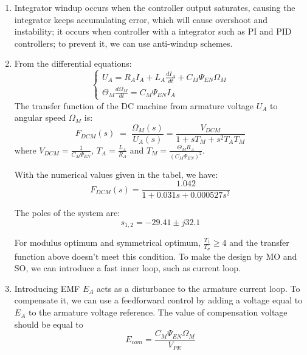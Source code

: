 \documentclass[12pt,a4paper, openany]{book}
\begin{document}
\begin{enumerate}
\item {\bf *}  Integrator windup occurs when the controller output saturates, causing the integrator keeps accumulating error, which will cause overshoot and instability; it occurs when controller with a integrator such as PI and PID controllers; to prevent it, we can use anti-windup schemes.
\item {\bf *} 
From the differential equations:
\begin{equation}
    \begin{cases}
    U_A = R_A I_A + L_A \frac{dI_A}{dt} + C_M \Psi_{EN} \Omega_M \\
    \Theta_M \frac{d \Omega_M}{dt}=C_M \Psi_{EN} I_A
    \end{cases}
\end{equation}
The transfer function of the DC machine from armature voltage $U_A$ to angular speed $\Omega_M$ is:
\begin{equation}
    F_{DCM}(s) \;=\; \frac{\Omega_M(s)}{U_A(s)} 
= \frac{V_{DCM}}{1 + sT_M + s^2 T_A T_M}
\end{equation}
where $V_{DCM} = \frac{1}{C_M \Psi_{EN}}$, $T_A = \frac{L_A}{R_A}$ and $T_M = \frac{\Theta_M R_A}{(C_M \Psi_{EN})^2}$.

With the numerical values given in the tabel, we have:
\begin{equation}
    F_{DCM}(s) = \frac{1.042}{1 + 0.031 s + 0.000527 s^2}        
\end{equation}

The poles of the system are:
\begin{equation}    
    s_{1,2} = -29.41 \pm j 32.1
\end{equation}

For modulus optimum and symmetrical optimum, $\frac{T_1}{T_\sigma} \geq 4$ and the transfer function above doesn't meet this condition. To make the design by MO and SO, we can introduce a fast inner loop, such as current loop.
\item {\bf *} Introducing EMF $E_A$ acts as a disturbance to the armature current loop. To compensate it, we can use a feedforward control by adding a voltage equal to $E_A$ to the armature voltage reference. The value of compensation voltage should be equal to 
\begin{equation}
  E_{com} =\frac{C_M \Psi_{EN} \Omega_M}{V_{PE}}  
\end{equation}

\end{enumerate}
\end{document}
